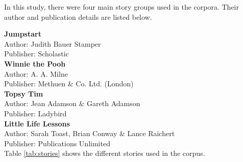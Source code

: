 %
%
%                 
\label{sec:appendixstories}

%
%
%
%

%
%

In this study, there were four main story groups used in the corpora. Their author and publication details are listed below.

\noindent
\textbf{Jumpstart}
~\\
Author: Judith Bauer Stamper\\
Publisher: Scholastic\\

\noindent
\textbf{Winnie the Pooh}
~\\
Author: A. A. Milne\\
Publisher: Methuen \& Co. Ltd. (London)\\

\noindent
\textbf{Topsy Tim}
~\\
Author: Jean Adamson \& Gareth Adamson\\
Publisher: Ladybird\\

\noindent
\textbf{Little Life Lessons}
~\\
Author: Sarah Toast, Brian Conway \& Lance Raichert\\
Publisher: Publications Unlimited\\

\noindent
Table \ref{tab:stories} shows the different stories used in the corpus. 

